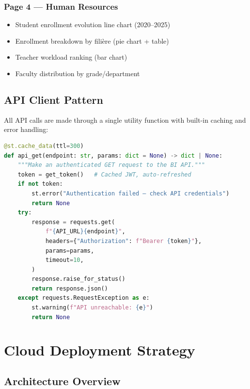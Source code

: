 \documentclass[12pt, a4paper]{report}
\begin{document}
\subsection{Page 4 — Human Resources}

\begin{itemize}
  \item Student enrollment evolution line chart (2020--2025)
  \item Enrollment breakdown by filière (pie chart + table)
  \item Teacher workload ranking (bar chart)
  \item Faculty distribution by grade/department
\end{itemize}

\section{API Client Pattern}

All API calls are made through a single utility function with built-in caching and error handling:

\begin{lstlisting}[language=Python, caption={Dashboard API Client — Authenticated Requests}]
@st.cache_data(ttl=300)
def api_get(endpoint: str, params: dict = None) -> dict | None:
    """Make an authenticated GET request to the BI API."""
    token = get_token()   # Cached JWT, auto-refreshed
    if not token:
        st.error("Authentication failed — check API credentials")
        return None
    try:
        response = requests.get(
            f"{API_URL}{endpoint}",
            headers={"Authorization": f"Bearer {token}"},
            params=params,
            timeout=10,
        )
        response.raise_for_status()
        return response.json()
    except requests.RequestException as e:
        st.warning(f"API unreachable: {e}")
        return None
\end{lstlisting}

\chapter{Cloud Deployment Strategy}

\section{Architecture Overview}
\end{document}
